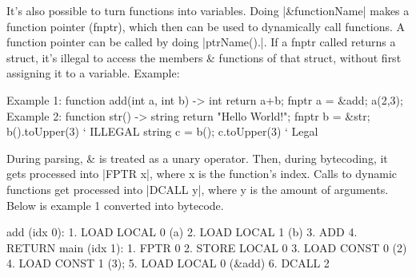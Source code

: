 \documentclass[12pt, letterpaper, oneside]{article}
\begin{document}
	
	\label{misc:fnptr}
	It's also possible to turn functions into variables. Doing \spverb|&functionName| makes a function pointer (fnptr), which then can be used to dynamically call functions. A function pointer can be called by doing \spverb|ptrName().|. If a fnptr called returns a struct, it's illegal to access the members \& functions of that struct, without first assigning it to a variable.
	\newpage
	Example:
	\begin{spverbatim}
		Example 1:
		function add(int a, int b) -> int {
			return a+b;
		}
		fnptr a = &add;
		a(2,3);
		Example 2:
		function str() -> string {
			return "Hello World!";
		}
		fnptr b = &str;
		b().toUpper(3) ` ILLEGAL
		string c = b();
		c.toUpper(3) ` Legal
	\end{spverbatim}
	\newline
	During parsing, \& is treated as a unary operator. Then, during bytecoding, it gets processed into \spverb|FPTR x|, where x is the function's index. Calls to dynamic functions get processed into \spverb|DCALL y|, where y is the amount of arguments. Below is example 1 converted into bytecode.
	
	\begin{spverbatim}
		add (idx 0):
			1. LOAD LOCAL 0 (a)
			2. LOAD LOCAL 1 (b)
			3. ADD
			4. RETURN
		main (idx 1):
			1. FPTR 0
			2. STORE LOCAL 0
			3. LOAD CONST 0 (2)
			4. LOAD CONST 1 (3);
			5. LOAD LOCAL 0 (&add)
			6. DCALL 2
	\end{spverbatim}
	\newpage
\end{document}

